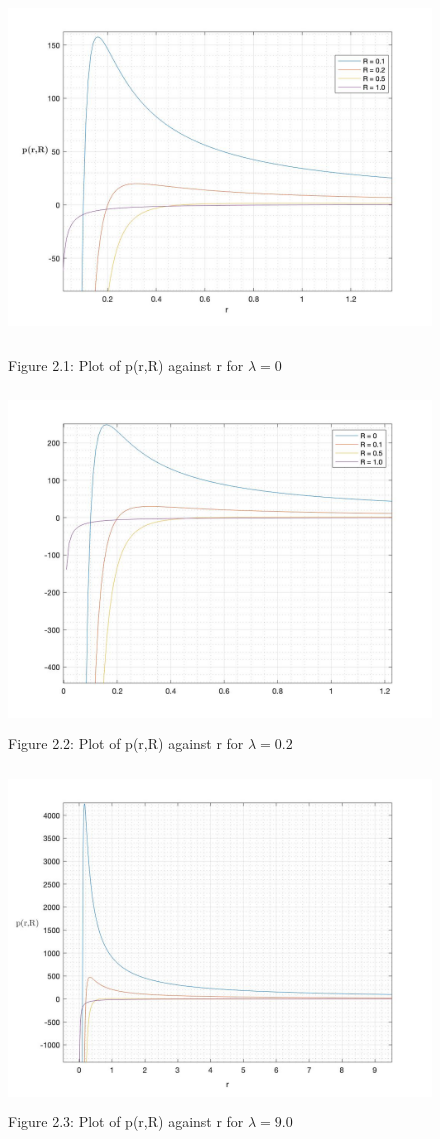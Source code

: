\documentclass[11pt]{article}
\begin{document}
\begin{figure}[H]
\includegraphics[width = 12cm, height = 9cm]{Q2.jpg}
\caption{Figure 2.1: Plot of p(r,R) against r for $ \lambda = 0$}
\includegraphics[width = 12cm, height = 9cm]{Q2(2).jpg}
\caption{Figure 2.2: Plot of p(r,R) against r for $\lambda = 0.2$}
\end{figure}
\begin{figure}[H]
\includegraphics[width = 12cm, height = 9cm]{Q2(3).jpg}
\caption{Figure 2.3: Plot of p(r,R) against r for $\lambda = 9.0$}
\end{figure}
\end{document}
